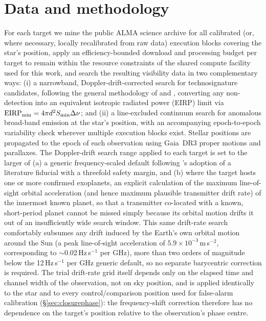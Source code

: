 \documentclass{openjournal}
\begin{document}
\section{Data and methodology}
\label{sec:method}

For each target we mine the public ALMA science archive for all calibrated (or,
where necessary, locally recalibrated from raw data) execution blocks covering
the star's position, apply an efficiency-bounded download and processing budget
per target to remain within the resource constraints of the shared compute
facility used for this work, and search the resulting visibility data in two
complementary ways: (i) a narrowband, Doppler-drift-corrected search for
technosignature candidates, following the general methodology of
\citet{Mason2024} and \citet{Enriquez2017}, converting any non-detection into an
equivalent isotropic radiated power (EIRP) limit via
$\mathrm{EIRP_{min}} = 4\pi d^{2} S_{\rm min} \Delta\nu$; and (ii) a
line-excluded continuum search for anomalous broad-band emission at the star's
position, with an accompanying epoch-to-epoch variability check wherever
multiple execution blocks exist. Stellar positions are propagated to the epoch
of each observation using Gaia~DR3 proper motions and parallaxes. The
Doppler-drift search range applied to each target is set to the larger of (a) a
generic frequency-scaled default following \citet{Mason2024}'s adoption of a
literature fiducial with a threefold safety margin, and (b) where the target
hosts one or more confirmed exoplanets, an explicit calculation of the maximum
line-of-sight orbital acceleration (and hence maximum plausible transmitter
drift rate) of the innermost known planet, so that a transmitter co-located with
a known, short-period planet cannot be missed simply because its orbital motion
drifts it out of an insufficiently wide search window. This same drift-rate
search comfortably subsumes any drift induced by the Earth's own orbital
motion around the Sun (a peak line-of-sight acceleration of
$5.9\times10^{-3}$\,m\,s$^{-2}$, corresponding to $\sim$0.02\,Hz\,s$^{-1}$
per GHz), more than two orders of magnitude below the 12\,Hz\,s$^{-1}$ per
GHz generic default, so no separate barycentric correction is required.
The trial drift-rate grid itself depends only on the elapsed time and
channel width of the observation, not on sky position, and is applied
identically to the star and to every control/comparison position used for
false-alarm calibration (\S\ref{sec:closurephase}): the frequency-shift
correction therefore has no dependence on the target's position relative
to the observation's phase centre.
\end{document}
